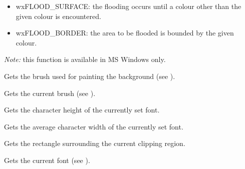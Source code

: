 \begin{itemize}\itemsep=0pt
\item wxFLOOD\_SURFACE: the flooding occurs until a colour other than the given colour is encountered.
\item wxFLOOD\_BORDER: the area to be flooded is bounded by the given colour.
\end{itemize}

{\it Note:} this function is available in MS Windows only.

\label{wxdcgetbackground}


Gets the brush used for painting the background (see ).

\label{wxdcgetbrush}


Gets the current brush (see ).

\label{wxdcgetcharheight}


Gets the character height of the currently set font.

\label{wxdcgetcharwidth}


Gets the average character width of the currently set font.

\label{wxdcgetclippingbox}


Gets the rectangle surrounding the current clipping region.


\label{wxdcgetfont}


Gets the current font (see ).

\label{wxdcgetlogicalfunction}


